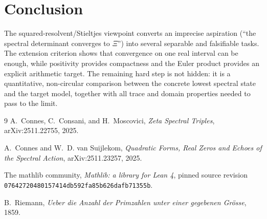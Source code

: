 \documentclass[11pt]{article}
\theoremstyle{definition}
\begin{document}
\section{Conclusion}

The squared-resolvent/Stieltjes viewpoint converts an imprecise aspiration
(``the spectral determinant converges to $\Xi$'') into several separable and
falsifiable tasks.  The extension criterion shows that convergence on one real
interval can be enough, while positivity provides compactness and the Euler
product provides an explicit arithmetic target.  The remaining hard step is
not hidden: it is a quantitative, non-circular comparison between the concrete
lowest spectral state and the target model, together with all trace and domain
properties needed to pass to the limit.

\begin{thebibliography}{9}
A.~Connes, C.~Consani, and H.~Moscovici,
\emph{Zeta Spectral Triples}, arXiv:2511.22755, 2025.

A.~Connes and W.~D. van Suijlekom,
\emph{Quadratic Forms, Real Zeros and Echoes of the Spectral Action},
arXiv:2511.23257, 2025.

The mathlib community,
\emph{Mathlib: a library for Lean 4}, pinned source revision
\texttt{07642720480157414db592fa85b626dafb71355b}.

B.~Riemann,
\emph{Ueber die Anzahl der Primzahlen unter einer gegebenen Grösse}, 1859.
\end{thebibliography}
\end{document}
